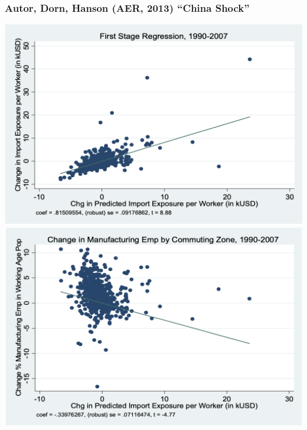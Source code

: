 \documentclass[english,xcolor=svgnames]{beamer}
\begin{document}
\begin{frame}
\frametitle[alignment=center]{Autor, Dorn, Hanson (AER, 2013) ``China Shock''}
\centering
\includegraphics[scale=0.325]{figures/ADHFIG1.png}\includegraphics[scale=0.325]{figures/ADHFIG2.png}
\end{frame}
\end{document}
